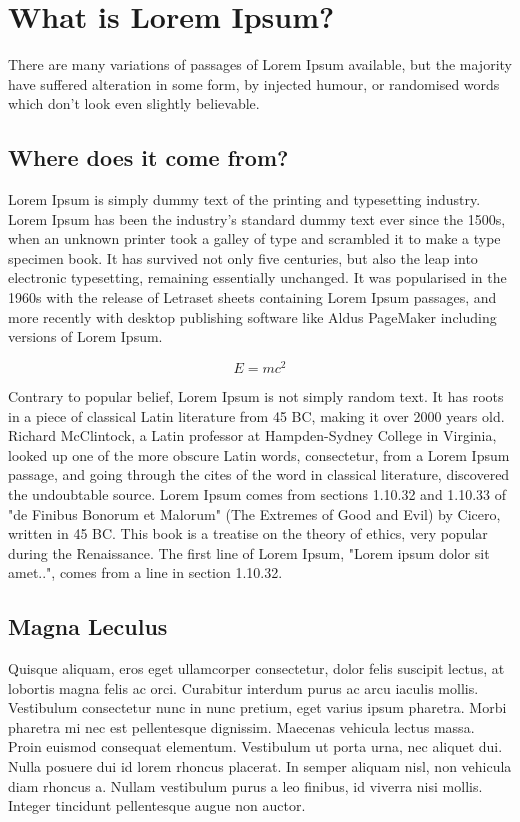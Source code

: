\chapter{What is Lorem Ipsum?}

There are many variations of passages of Lorem Ipsum available, but the majority have suffered alteration in some form, by injected humour, or randomised words which don't look even slightly believable. 

\section{Where does it come from?}

Lorem Ipsum is simply dummy text of the printing and typesetting industry. Lorem Ipsum has been the industry's standard dummy text ever since the 1500s, when an unknown printer took a galley of type and scrambled it to make a type specimen book. It has survived not only five centuries, but also the leap into electronic typesetting, remaining essentially unchanged. It was popularised in the 1960s with the release of Letraset sheets containing Lorem Ipsum passages, and more recently with desktop publishing software like Aldus PageMaker including versions of Lorem Ipsum.

\begin{equation}
  E = mc^2
\end{equation}

Contrary to popular belief, Lorem Ipsum is not simply random text. It has roots in a piece of classical Latin literature from 45 BC, making it over 2000 years old. Richard McClintock, a Latin professor at Hampden-Sydney College in Virginia, looked up one of the more obscure Latin words, consectetur, from a Lorem Ipsum passage, and going through the cites of the word in classical literature, discovered the undoubtable source. Lorem Ipsum comes from sections 1.10.32 and 1.10.33 of "de Finibus Bonorum et Malorum" (The Extremes of Good and Evil) by Cicero, written in 45 BC. This book is a treatise on the theory of ethics, very popular during the Renaissance. The first line of Lorem Ipsum, "Lorem ipsum dolor sit amet..", comes from a line in section 1.10.32.

\section{Magna Leculus}

Quisque aliquam, eros eget ullamcorper consectetur, dolor felis suscipit lectus, at lobortis magna felis ac orci. Curabitur interdum purus ac arcu iaculis mollis. Vestibulum consectetur nunc in nunc pretium, eget varius ipsum pharetra. Morbi pharetra mi nec est pellentesque dignissim. Maecenas vehicula lectus massa. Proin euismod consequat elementum. Vestibulum ut porta urna, nec aliquet dui. Nulla posuere dui id lorem rhoncus placerat. In semper aliquam nisl, non vehicula diam rhoncus a. Nullam vestibulum purus a leo finibus, id viverra nisi mollis. Integer tincidunt pellentesque augue non auctor.

